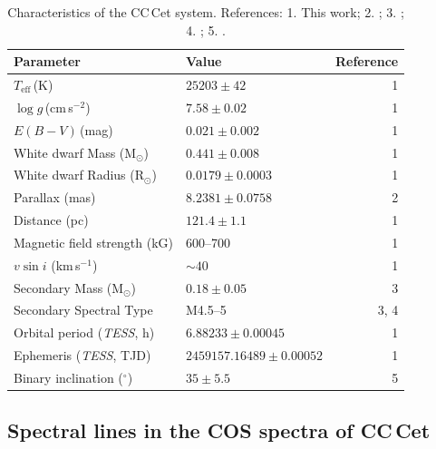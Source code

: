 \documentclass[fleqn,usenatbib]{mnras}
\newcommand{\Msun}{\mbox{$\mathrm{M}_{\odot}$}}
\newcommand{\Rsun}{\mbox{$\mathrm{R}_{\odot}$}}
\begin{document}



\begin{table} 
\setlength{\tabcolsep}{4pt} %
\centering 
\caption{Characteristics of the CC\,Cet system. 
References: 1. This work; 2. \citet{gaia18-1}; 3. \citet{safferetal93-1}; 4. \citet{tappertetal07-2}; 5. \citet{somersetal96-2}.}
\begin{tabular}{llr}
\hline
Parameter & Value & Reference \\
\hline 
$T_{\mathrm{eff}}$\,(K)           & $25203\pm42$              & 1\\
$\log g$\,(cm\,s$^{-2}$)          &  $7.58\pm0.02$            & 1\\
$E(B-V)$\,(mag)                   & $0.021\pm0.002$           & 1\\
White dwarf Mass (\Msun)          & $0.441\pm0.008$           & 1\\
White dwarf Radius (\Rsun)        & $0.0179\pm0.0003$         & 1\\
Parallax (mas)                    & $8.2381\pm0.0758$         & 2 \\
Distance (pc)                     & $121.4\pm1.1$             & 1\\
Magnetic field strength (kG)      & 600--700                  & 1 \\
$v \sin i$ (km\,s$^{-1}$)         & $\sim 40$                 & 1\\
Secondary Mass (\Msun)            & $0.18\pm0.05$             & 3\\
Secondary Spectral Type           & M4.5--5                   & 3, 4 \\ 
Orbital period (\textit{TESS}, h) & $6.88233\pm0.00045$        & 1\\
Ephemeris (\textit{TESS}, TJD)   & $2459157.16489\pm0.00052$ & 1 \\
Binary inclination ($^{\circ}$)   & $35\pm5.5$                & 5 \\

\hline
\end{tabular} 
\label{tab:characteristics} 
\end{table} 

\subsection{Spectral lines in the COS spectra of CC\,Cet}
\end{document}
